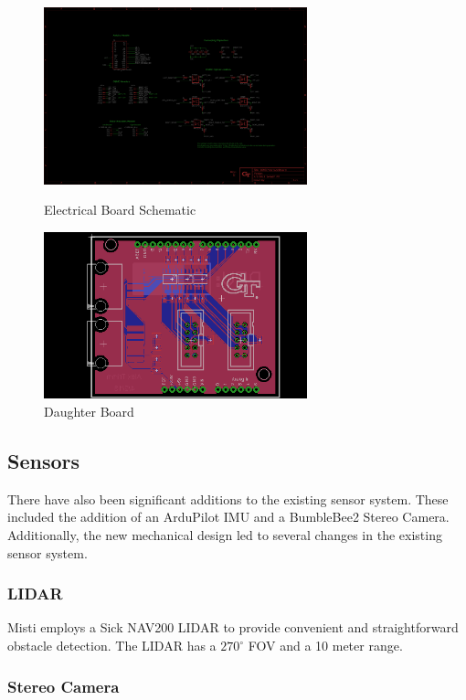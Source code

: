 \begin{figure}[H]
\begin{minipage}[b]{0.5\linewidth}
\centering
\includegraphics[width=3in]{./Pics/schematisch.png}
\caption{Electrical Board Schematic}
\label{FIG:Schematic}
\end{minipage}
\hspace{0.1in}
\begin{minipage}[b]{0.5\linewidth}
\centering
\includegraphics[width=3in]{./Pics/baord.png}
\caption{Daughter Board}
\label{FIG:Board}
\end{minipage}
\end{figure}

\subsection{Sensors}

There have also been significant additions to the existing sensor system. These included the addition of an ArduPilot IMU and a BumbleBee2 Stereo Camera. Additionally, the new mechanical design led to several changes in the existing sensor system.
\subsubsection{LIDAR}

Misti employs a Sick NAV200 LIDAR to provide convenient and straightforward obstacle detection. The LIDAR has a $270^{\circ}$ FOV and a 10 meter range.

\subsubsection{Stereo Camera}

